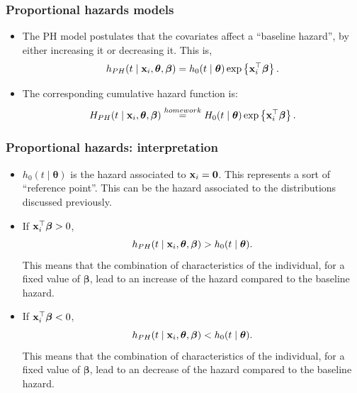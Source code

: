 \documentclass[10pt,handout,compress]{beamer}
\newcommand{\bbeta}{\bm{\beta}}
\newcommand{\btheta}{\bm{\theta}}
\newcommand{\bx}{{\bf x}}
\begin{document}
\begin{frame}
\frametitle{Proportional hazards models}
\begin{itemize}
\item The PH model postulates that the covariates affect a ``baseline hazard'', by either increasing it  or decreasing it. This is,
\pause
\begin{equation*}
h_{PH}(t \mid \bx_i, \btheta,\bbeta) = h_0(t \mid \btheta) \exp\left\{ \bx_i ^{\top}\bbeta\right\} .
\end{equation*}
\pause
\item The corresponding cumulative hazard function is:
\begin{equation*}
H_{PH}(t \mid \bx_i, \btheta,\bbeta) \stackrel{\tiny homework}{=}  H_0(t \mid \btheta) \exp\left\{ \bx_i ^{\top}\bbeta\right\}.  
\end{equation*}
\end{itemize}
\end{frame}


\begin{frame}
\frametitle{Proportional hazards: interpretation}
\begin{itemize}
\item $h_0(t \mid \btheta)$ is the hazard associated to $\bx_i = {\bf 0}$. This represents a sort of ``reference point''. This can be the hazard associated to the distributions discussed previously.
\pause
\item If $\bx_i ^{\top}\bbeta >0$, 
\[h_{PH}(t \mid \bx_i, \btheta,\bbeta) > h_0(t \mid \btheta).\]
\pause This means that the combination of characteristics of the individual, for a fixed value of $\bbeta$, lead to an increase of the hazard compared to the baseline hazard. \pause
\item If $\bx_i ^{\top}\bbeta <0$, 
\[h_{PH}(t \mid \bx_i, \btheta,\bbeta) < h_0(t \mid \btheta).\]
\pause This means that the combination of characteristics of the individual, for a fixed value of $\bbeta$, lead to an decrease of the hazard compared to the baseline hazard.
\end{itemize}
\end{frame}
\end{document}
